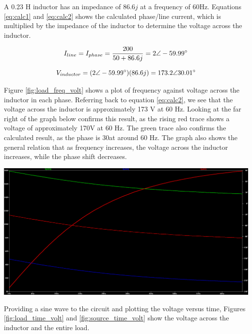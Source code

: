 \documentclass[journal]{IEEEtran}
\begin{document}
\noindent A 0.23 H inductor has an impedance of $86.6j$ at a frequency of 60Hz. Equations \ref{eq:calc1} and  \ref{eq:calc2} shows the calculated phase/line current, which is multiplied by the impedance of the inductor to determine the voltage across the inductor. 



\begin{equation}
I_{line} = I_{phase} = \frac{200}{50+86.6j} = 2 \angle -59.99\degree
\label{eq:calc1}
\end{equation}


\begin{equation}
V_{inductor} = (2 \angle -59.99\degree)(86.6j) = 173.2 \angle 30.01\degree
\label{eq:calc2}
\end{equation}



\noindent Figure \ref{fig:load_freq_volt} shows a plot of frequency against voltage across the inductor in each phase. Referring back to equation \ref{eq:calc2}, we see that the voltage across the inductor is approximately 173 V at 60 Hz. Looking at the far right of the graph below confirms this result, as the rising red trace shows a voltage of approximately 170V at 60 Hz. The green trace also confirms the calculated result, as the phase is 30\degree at around 60 Hz. The graph also shows the general relation that as frequency increases, the voltage across the inductor increases, while the phase shift decreases.

\begingroup
    \centering
    \medskip
    \includegraphics[width=\columnwidth]{images/Lab_9_ss_1.PNG}
    \label{fig:load_freq_volt}
    \medskip
\endgroup


\noindent Providing a sine wave to the circuit and plotting the voltage versus time, Figures \ref{fig:load_time_volt} and \ref{fig:source_time_volt} show the voltage across the inductor and the entire load.
\end{document}
